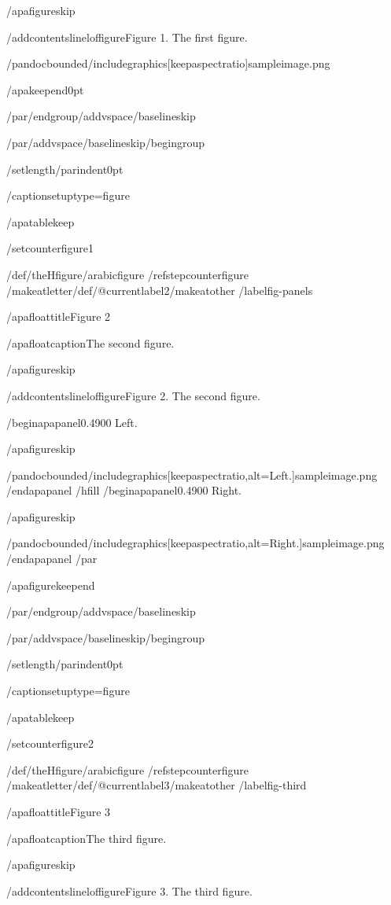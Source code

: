 /apafigureskip

/addcontentsline{lof}{figure}{Figure 1. The first figure.}

/pandocbounded{/includegraphics[keepaspectratio]{sampleimage.png}}

/apakeepend{0pt}

/par/endgroup/addvspace{/baselineskip}

/par/addvspace{/baselineskip}/begingroup

/setlength{/parindent}{0pt}

/captionsetup{type=figure}

/apatablekeep

/setcounter{figure}{1}

/def/theHfigure{/arabic{figure}}%
/refstepcounter{figure}%
/makeatletter/def/@currentlabel{2}/makeatother%
/label{fig-panels}

/apafloattitle{Figure 2}

/apafloatcaption{The second figure.}

/apafigureskip

/addcontentsline{lof}{figure}{Figure 2. The second figure.}

/begin{apapanel}{0.4900}%
Left.

/apafigureskip

/pandocbounded{/includegraphics[keepaspectratio,alt={Left.}]{sampleimage.png}}
/end{apapanel}%
/hfill
/begin{apapanel}{0.4900}%
Right.

/apafigureskip

/pandocbounded{/includegraphics[keepaspectratio,alt={Right.}]{sampleimage.png}}
/end{apapanel}%
/par

/apafigurekeepend

/par/endgroup/addvspace{/baselineskip}

/par/addvspace{/baselineskip}/begingroup

/setlength{/parindent}{0pt}

/captionsetup{type=figure}

/apatablekeep

/setcounter{figure}{2}

/def/theHfigure{/arabic{figure}}%
/refstepcounter{figure}%
/makeatletter/def/@currentlabel{3}/makeatother%
/label{fig-third}

/apafloattitle{Figure 3}

/apafloatcaption{The third figure.}

/apafigureskip

/addcontentsline{lof}{figure}{Figure 3. The third figure.}

